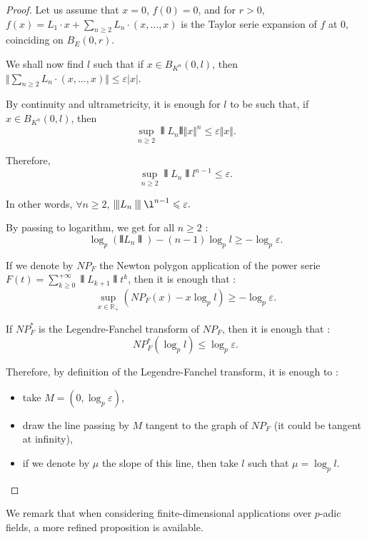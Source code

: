 \documentclass{lms}
\begin{document}
\begin{proof}
Let us assume that $x=0$, $f(0)=0$, and for $r>0$, $f(x)=L_1 \cdot x +\sum_{n \geq 2} L_n \cdot (x, \dots,x)$ is the Taylor serie expansion of $f$ at $0$, coinciding on $B_E (0,r)$.

We shall now find $l$ such that if $x \in B_{K^n}(0,l)$, then $\Vert \sum_{n \geq 2} L_n \cdot (x,\dots,x) \Vert \leq \varepsilon \vert x \vert $.

By continuity and ultrametricity, it is enough for $l$ to be such that, if $x \in B_{K^n}(0,l)$, then  \[ \sup_{n \geq 2} \interleave L_n \interleave \Vert x \Vert^n \leq \varepsilon \Vert x \Vert .\] 

Therefore, \[ \sup_{n \geq 2} \interleave L_n \interleave l^{n-1}  \leq \varepsilon . \] 

In other words, $\forall n \geq 2$, $\interleave L_n \interleave \l^{n-1}  \leq \varepsilon.$

By passing to logarithm, we get for all $n \geq 2$ : \[ \log_p (\interleave L_n \interleave )-(n-1) \log_p l \geq - \log_p \varepsilon.\]

If we denote by $NP_F$ the Newton polygon application of the power serie $F(t) = \sum_{k\geq 0}^{+\infty} \interleave L_{k+1} \interleave  t^k$, then it is enough that :
\[ \sup_{ x \in \mathbb{R}_+} \left( NP_F(x) -x  \log_p l \right) \geq - \log_p \varepsilon.\]

If $NP_F^*$ is the Legendre-Fanchel transform of $NP_F$, then it is enough that :
\[ NP_F^* \left( \log_p l  \right) \leq \log_p \varepsilon.\]

Therefore, by definition of the Legendre-Fanchel transform, it is enough to :
\begin{itemize}
\item take $M=(0,\log_p \varepsilon)$,
\item draw the line passing by $M$ tangent to the graph of $NP_F$ (it could be tangent at infinity),
\item if we denote by $\mu$ the slope of this line, then take $l$ such that $\mu=\log_p l$.
\end{itemize}
\end{proof}

We remark that when considering finite-dimensional applications over $p$-adic fields, a more refined proposition is available.
\end{document}

